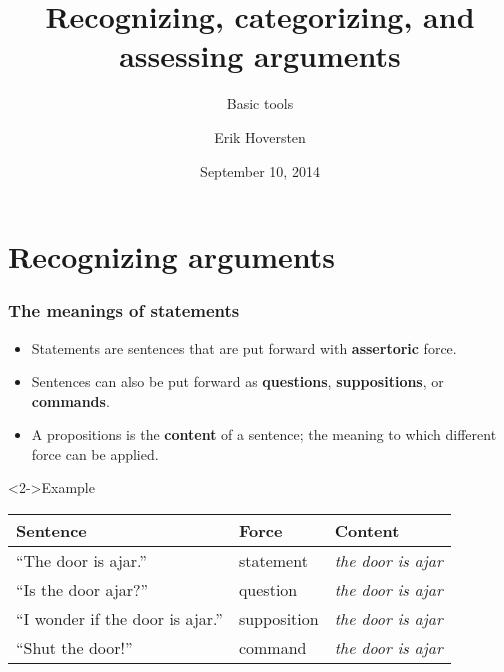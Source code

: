 \documentclass[10pt,letterpaper,xcolor=dvipsnames,handout]{beamer}
\title{Recognizing, categorizing, and assessing arguments}
\subtitle{Basic tools}
\author[Hoversten]{Erik Hoversten}
\institute[lrp-f14]{Logic, reason, and persuasion: fall 2014 \\ Rutgers University}
\date[09/10/2014]{September 10, 2014}
\begin{document}
\begin{frame}
\titlepage
\end{frame}

\section{Recognizing arguments}

\begin{frame}
\frametitle{The meanings of statements}

\begin{itemize}
  \item Statements are sentences that are put forward with \textbf{assertoric} force.
  \item Sentences can also be put forward as \textbf{questions}, \textbf{suppositions}, or \textbf{commands}.
  \item A propositions is the \textbf{content} of a sentence; the meaning to which different force can be applied.
\end{itemize}

\begin{block}<2->{Example}
\begin{tabular}{lll}
Sentence & Force & Content \\ \hline
``The door is ajar.'' & statement & \textit{the door is ajar} \\
``Is the door ajar?'' & question & \textit{the door is ajar} \\
``I wonder if the door is ajar.'' & supposition & \textit{the door is ajar} \\
``Shut the door!'' & command & \textit{the door is ajar} \\
\end{tabular}
\end{block}


\end{frame}
\end{document}
